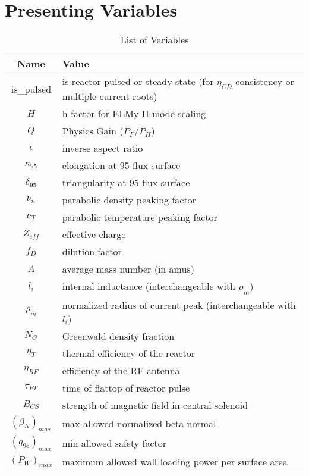 \chapter{Presenting  Variables}

\label{chapter:var_table}

\begin{table}[h]
\caption{List of  Variables}
\begin{tabular}{c|l}
\textbf{Name} & \textbf{Value} \\
\hline
is\_pulsed & is reactor pulsed or steady-state (for $\eta_{CD}$ consistency or multiple current roots) \\
$H$ & h factor for ELMy H-mode scaling \\
$Q$ & Physics Gain ($P_F/P_H$) \\
$\epsilon$ & inverse aspect ratio \\
$\kappa_{95}$ &  elongation at 95 flux surface \\
$\delta_{95}$ &  triangularity at 95 flux surface \\
$\nu_n$ &  parabolic density peaking factor \\
$\nu_T$ &  parabolic temperature peaking factor \\
$Z_{eff}$ & effective charge \\
$f_D$ & dilution factor \\
$A$ & average mass number (in amus) \\
$l_i$ & internal inductance (interchangeable with $\rho_m$) \\
$\rho_m$ & normalized radius of current peak (interchangeable with $l_i$) \\
$N_G$ & Greenwald density fraction \\
$\eta_T$ & thermal efficiency of the reactor \\
$\eta_{RF}$ &  efficiency of the RF antenna \\
$\tau_{FT}$ &  time of flattop of reactor pulse \\
$B_{CS}$ &  strength of magnetic field in central solenoid \\
$(\beta_N)_{max}$ &  max allowed normalized beta normal \\
$(q_{95})_{max}$ &  min allowed safety factor \\
$(P_W)_{max}$ & maximum allowed wall loading power per surface area
\end{tabular}
\end{table}

